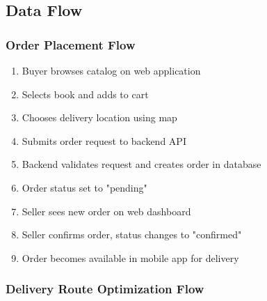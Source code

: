 \documentclass[12pt,a4paper]{article}
\begin{document}
\subsection{Data Flow}

\subsubsection{Order Placement Flow}

\begin{enumerate}
    \item Buyer browses catalog on web application
    \item Selects book and adds to cart
    \item Chooses delivery location using map
    \item Submits order request to backend API
    \item Backend validates request and creates order in database
    \item Order status set to "pending"
    \item Seller sees new order on web dashboard
    \item Seller confirms order, status changes to "confirmed"
    \item Order becomes available in mobile app for delivery
\end{enumerate}

\subsubsection{Delivery Route Optimization Flow}
\end{document}
